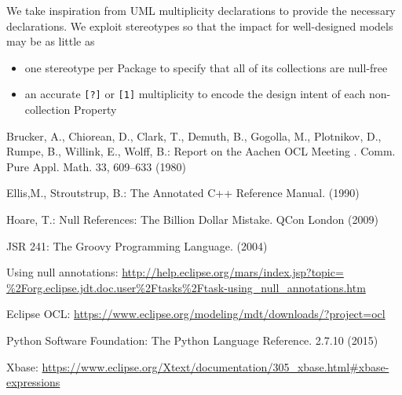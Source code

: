 \documentclass{llncs}
\begin{document}
We take inspiration from UML multiplicity declarations to provide the necessary declarations. We exploit stereotypes so that the impact for well-designed models may be as little as 
\begin{itemize}
\item one stereotype per Package to specify that all of its collections are null-free
\item an accurate \verb$[?]$ or \verb$[1]$ multiplicity to encode the design intent of each non-collection Property
\end{itemize}

%
%
\begin{thebibliography}{}
%
Brucker, A., Chiorean, D., Clark, T., Demuth, B., Gogolla, M., Plotnikov, D., Rumpe, B., Willink, E., Wolff, B.:
Report on the Aachen OCL Meeting .
Comm. Pure Appl. Math. 33, 609--633 (1980)

Ellis,M., Stroutstrup, B.:
The Annotated C++ Reference Manual.
(1990)

Hoare, T.:
Null References: The Billion Dollar Mistake.
QCon London (2009)

JSR 241:
The Groovy Programming Language.
(2004)

Using null annotations:
\url{http://help.eclipse.org/mars/index.jsp?topic=
\%2Forg.eclipse.jdt.doc.user\%2Ftasks\%2Ftask-using\_null\_annotations.htm}

Eclipse OCL:
\url{https://www.eclipse.org/modeling/mdt/downloads/?project=ocl}

Python Software Foundation:
The Python Language Reference.
2.7.10 (2015)

Xbase:
\url{https://www.eclipse.org/Xtext/documentation/305\_xbase.html\#xbase-expressions}

\end{thebibliography}
\end{document}

